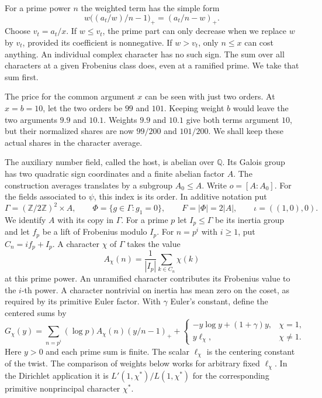 \documentclass[11pt,letterpaper]{article}
\newcommand{\Z}{\mathbb Z}
\numberwithin{equation}{section}
\begin{document}
For a prime power \(n\) the weighted term has the simple form
\[
              w\bigl((a_t/w)/n-1\bigr)_+=(a_t/n-w)_+ .
\]
Choose \(v_t=a_t/x\). If \(w\le v_t\), the prime part can only decrease when we replace \(w\) by \(v_t\), provided its coefficient is nonnegative. If \(w>v_t\), only \(n\le x\) can cost anything. An individual complex character has no such sign. The sum over all characters at a given Frobenius class does, even at a ramified prime. We take that sum first.

The price for the common argument \(x\) can be seen with just two orders. At \(x=b=10\), let the two orders be \(99\) and \(101\). Keeping weight \(b\) would leave the two arguments \(9.9\) and \(10.1\). Weights \(9.9\) and \(10.1\) give both terms argument \(10\), but their normalized shares are now \(99/200\) and \(101/200\). We shall keep these actual shares in the character average.

The auxiliary number field, called the host, is abelian over \(\mathbb Q\). Its Galois group has two quadratic sign coordinates and a finite abelian factor \(A\). The construction averages translates by a subgroup \(A_0\le A\). Write \(o=[A:A_0]\). For the fields associated to \(\psi\), this index is its order. In additive notation put
\[
 \Gamma=(\Z/2\Z)^2\times A,\qquad
 \Phi=\{g\in\Gamma:g_1=0\},\qquad F=|\Phi|=2|A|,
 \qquad \iota=((1,0),0).
\]
We identify \(A\) with its copy in \(\Gamma\). For a prime \(p\) let \(I_p\le\Gamma\) be its inertia group and let \(f_p\) be a lift of Frobenius modulo \(I_p\). For \(n=p^i\) with \(i\ge1\), put \(C_n=if_p+I_p\). A character \(\chi\) of \(\Gamma\) takes the value
\[
 A_\chi(n)=\frac1{|I_p|}\sum_{k\in C_n}\chi(k)
\]
at this prime power. An unramified character contributes its Frobenius value to the \(i\)-th power. A character nontrivial on inertia has mean zero on the coset, as required by its primitive Euler factor. With \(\gamma\) Euler's constant, define the centered sums by
\begin{equation}\label{eq:G}
 G_\chi(y)=\sum_{n=p^i}(\log p) A_\chi(n)(y/n-1)_+
 +\begin{cases}
       -y\log y+(1+\gamma)y,&\chi=1,\\
       y\ell_\chi,&\chi\ne1 .
   \end{cases}
\end{equation}
Here \(y>0\) and each prime sum is finite. The scalar \(\ell_\chi\) is the centering constant of the twist. The comparison of weights below works for arbitrary fixed \(\ell_\chi\). In the Dirichlet application it is \(L'(1,\chi^*)/L(1,\chi^*)\) for the corresponding primitive nonprincipal character \(\chi^*\).
\end{document}
